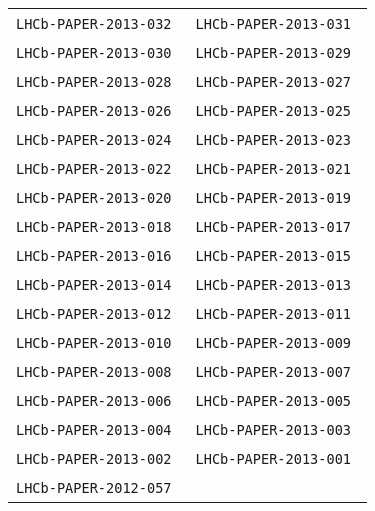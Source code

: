 \begin{center}
\begin{longtable}{ll}
\texttt{LHCb-PAPER-2013-032}~\cite{LHCb-PAPER-2013-032} &
\texttt{LHCb-PAPER-2013-031}~\cite{LHCb-PAPER-2013-031} \\
\texttt{LHCb-PAPER-2013-030}~\cite{LHCb-PAPER-2013-030} &
\texttt{LHCb-PAPER-2013-029}~\cite{LHCb-PAPER-2013-029} \\
\texttt{LHCb-PAPER-2013-028}~\cite{LHCb-PAPER-2013-028} &
\texttt{LHCb-PAPER-2013-027}~\cite{LHCb-PAPER-2013-027} \\
\texttt{LHCb-PAPER-2013-026}~\cite{LHCb-PAPER-2013-026} &
\texttt{LHCb-PAPER-2013-025}~\cite{LHCb-PAPER-2013-025} \\
\texttt{LHCb-PAPER-2013-024}~\cite{LHCb-PAPER-2013-024} &
\texttt{LHCb-PAPER-2013-023}~\cite{LHCb-PAPER-2013-023} \\
\texttt{LHCb-PAPER-2013-022}~\cite{LHCb-PAPER-2013-022} &
\texttt{LHCb-PAPER-2013-021}~\cite{LHCb-PAPER-2013-021} \\
\texttt{LHCb-PAPER-2013-020}~\cite{LHCb-PAPER-2013-020} &
\texttt{LHCb-PAPER-2013-019}~\cite{LHCb-PAPER-2013-019} \\
\texttt{LHCb-PAPER-2013-018}~\cite{LHCb-PAPER-2013-018} &
\texttt{LHCb-PAPER-2013-017}~\cite{LHCb-PAPER-2013-017} \\
\texttt{LHCb-PAPER-2013-016}~\cite{LHCb-PAPER-2013-016} &
\texttt{LHCb-PAPER-2013-015}~\cite{LHCb-PAPER-2013-015} \\
\texttt{LHCb-PAPER-2013-014}~\cite{LHCb-PAPER-2013-014} &
\texttt{LHCb-PAPER-2013-013}~\cite{LHCb-PAPER-2013-013} \\
\texttt{LHCb-PAPER-2013-012}~\cite{LHCb-PAPER-2013-012} &
\texttt{LHCb-PAPER-2013-011}~\cite{LHCb-PAPER-2013-011} \\
\texttt{LHCb-PAPER-2013-010}~\cite{LHCb-PAPER-2013-010} &
\texttt{LHCb-PAPER-2013-009}~\cite{LHCb-PAPER-2013-009} \\
\texttt{LHCb-PAPER-2013-008}~\cite{LHCb-PAPER-2013-008} &
\texttt{LHCb-PAPER-2013-007}~\cite{LHCb-PAPER-2013-007} \\
\texttt{LHCb-PAPER-2013-006}~\cite{LHCb-PAPER-2013-006} &
\texttt{LHCb-PAPER-2013-005}~\cite{LHCb-PAPER-2013-005} \\
\texttt{LHCb-PAPER-2013-004}~\cite{LHCb-PAPER-2013-004} &
\texttt{LHCb-PAPER-2013-003}~\cite{LHCb-PAPER-2013-003} \\
\texttt{LHCb-PAPER-2013-002}~\cite{LHCb-PAPER-2013-002} &
\texttt{LHCb-PAPER-2013-001}~\cite{LHCb-PAPER-2013-001} \\
\hline
\texttt{LHCb-PAPER-2012-057}~\cite{LHCb-PAPER-2012-057} \\

\end{longtable}
\end{center}
